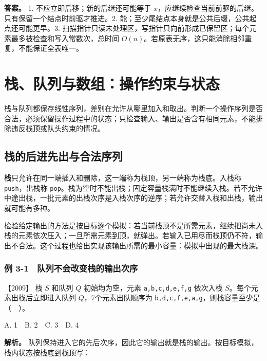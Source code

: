 \textbf{答案。} 1. 不应立即后移；新的后继还可能等于 \(x\)，应继续检查当前前驱的后继。只有保留一个结点时前驱才推进。2. 能；至少尾结点本身就是公共后缀，公共起点还可能更早。3. 扫描指针只读未处理区，写指针只向前形成已保留区；每个元素最多被检查和写入常数次，总时间 \(O(n)\)。若原表无序，这只能消除相邻重复，不能保证全表唯一。

\chapter{栈、队列与数组：操作约束与状态}\label{ds-ch3}

栈与队列都保存线性序列，差别在允许从哪里加入和取出。判断一个操作序列是否合法，必须保留操作过程中的状态；只检查输入、输出是否含有相同元素，不能排除违反栈顶或队头约束的情况。

\section{栈的后进先出与合法序列}\label{ds-03-01}

\textbf{栈}只允许在同一端插入和删除，这一端称为栈顶，另一端称为栈底。入栈称 \allowbreak{}\texttt{push}，出栈称 \allowbreak{}\texttt{pop}。栈为空时不能出栈；固定容量栈满时不能继续入栈。若不允许中途出栈，一批元素的出栈次序是入栈次序的逆序；若允许交替入栈和出栈，输出就可能有多种。

检验给定输出的方法是按目标逐个模拟：若当前栈顶不是所需元素，继续把尚未入栈的元素依次压入；一旦所需元素到顶，就弹出。若输入已用尽而栈顶仍不符，输出不合法。这个过程也给出实现该输出所需的最小容量：模拟中出现的最大栈深。

\subsection{例 3-1　队列不会改变栈的输出次序}\label{ds-ex3-1}

\noindent{}【2009】 栈 \(S\) 和队列 \(Q\) 初始均为空，元素 \allowbreak{}\texttt{a,}\allowbreak{}\texttt{b,}\allowbreak{}\texttt{c,}\allowbreak{}\texttt{d,}\allowbreak{}\texttt{e,}\allowbreak{}\texttt{f,}\allowbreak{}\texttt{g} 依次入栈 \(S\)。每个元素出栈后立即进入队列 \(Q\)，7个元素出队顺序为 \allowbreak{}\texttt{b,}\allowbreak{}\texttt{d,}\allowbreak{}\texttt{c,}\allowbreak{}\texttt{f,}\allowbreak{}\texttt{e,}\allowbreak{}\texttt{a,}\allowbreak{}\texttt{g}，则栈容量至少是（　）。

A. 1　B. 2　C. 3　D. 4


\textbf{解析。} 队列保持进入它的先后次序，因此它的输出就是栈的输出。按目标模拟，栈内状态按栈底到栈顶写：

